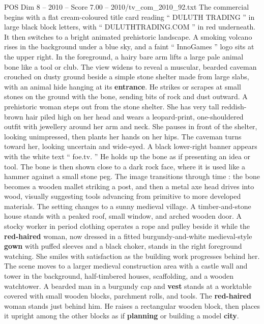 \begin{textsample}{POS Dim 8 – 2010 – Score 7.00 – 2010/tv\_com\_2010\_92.txt}  \label{ex:f8_pos_026}
The commercial begins with a flat cream-coloured title card reading “ DULUTH TRADING ” in large black block letters, with “ DULUTHTRADING.COM ” in red underneath.
It then switches to a bright animated prehistoric landscape.
A smoking volcano rises in the background under a blue sky, and a faint “ InnoGames ” logo sits at the upper right.
In the foreground, a hairy bare arm lifts a large pale animal bone like a tool or club.
The view widens to reveal a muscular, bearded caveman crouched on dusty ground beside a simple stone shelter made from large slabs, with an animal hide hanging at its \textbf{entrance}.
He strikes or scrapes at small stones on the ground with the bone, sending bits of rock and dust outward.
A prehistoric woman steps out from the stone shelter.
She has very tall reddish-brown hair piled high on her head and wears a leopard-print, one-shouldered outfit with jewellery around her arm and neck.
She pauses in front of the shelter, looking unimpressed, then plants her hands on her hips.
The caveman turns toward her, looking uncertain and wide-eyed.
A black lower-right banner appears with the white text “ foe.tv. ” He holds up the bone as if presenting an idea or tool.
The bone is then shown close to a dark rock face, where it is used like a hammer against a small stone peg.
The image transitions through time : the bone becomes a wooden mallet striking a post, and then a metal axe head drives into wood, visually suggesting tools advancing from primitive to more developed materials.
The setting changes to a sunny medieval village.
A timber-and-stone house stands with a peaked roof, small window, and arched wooden door.
A stocky worker in period clothing operates a rope and pulley beside it while the \textbf{red-haired} woman, now dressed in a fitted burgundy-and-white medieval-style \textbf{gown} with puffed sleeves and a black choker, stands in the right foreground watching.
She smiles with satisfaction as the building work progresses behind her.
The scene moves to a larger medieval construction area with a castle wall and tower in the background, half-timbered houses, scaffolding, and a wooden watchtower.
A bearded man in a burgundy cap and \textbf{vest} stands at a worktable covered with small wooden blocks, parchment rolls, and tools.
The \textbf{red-haired} woman stands just behind him.
He raises a rectangular wooden block, then places it upright among the other blocks as if \textbf{planning} or building a model \textbf{city}.

\end{textsample}
